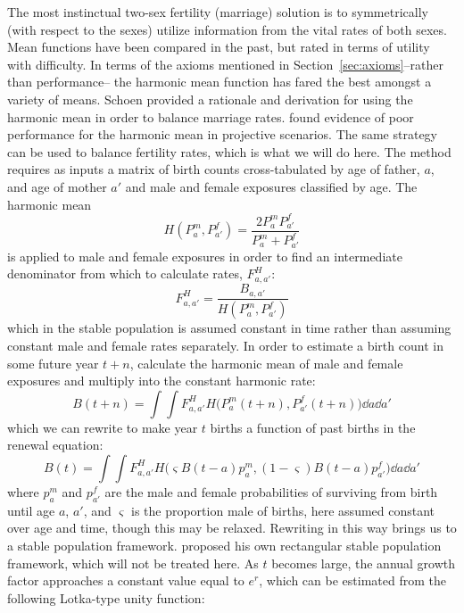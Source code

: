 The most instinctual two-sex fertility (marriage) solution is to symmetrically
(with respect to the sexes) utilize information from the vital rates of both
sexes. Mean functions have been compared in the past\citep[see
e.g.][]{keyfitz1972mathematics}, but rated in terms of utility with difficulty.
In terms of the axioms mentioned in Section~\ref{sec:axioms}--rather than
performance-- the harmonic mean function has fared the best amongst a variety of
means. Schoen \citep{schoen1978standardized, schoen1977two, schoen1981harmonic}
provided a rationale and derivation for using the harmonic mean in order to 
balance marriage rates. \citet{martcheva2001mathematics} found evidence of
poor performance for the harmonic mean in projective scenarios. The same
strategy can be used to balance fertility rates, which is what we will do here. The method requires as inputs a matrix of birth counts cross-tabulated by age of father, $a$, and age of mother $a'$ 
and male and female exposures classified by age. The harmonic mean
\begin{equation}
H(P_a^m, P_{a'}^f) = \frac{2 P_a^m P_{a'}^f}{P_a^m + P_{a'}^f}
\end{equation}
is applied to male and female exposures in order to find an intermediate
denominator from which to calculate rates, $F_{a,a'}^H$:
 \FloatBarrier
 \begin{equation}
 F_{a,a'}^H = \frac{B_{a,a'}}{H(P_a^m, P_{a'}^f)}
 \end{equation}
which in the stable population is assumed constant in time rather than
assuming constant male and female rates separately. In order to estimate 
a birth count in some future year $t+n$, calculate the harmonic mean
of male and female exposures and multiply into the constant harmonic rate:
 \begin{equation}
 B(t+n) = \int \int F_{a,a'}^H H\Big(P_{a}^m(t+n), P_{a'}^f(t+n)\Big) \dd a \dd
 a'
 \end{equation}
which we can rewrite to make year $t$ births a function of past births in the
renewal equation:
 \begin{equation}
 B(t) = \int \int F_{a,a'}^H H\Big(\varsigma B(t-a)p_a^m, (1-\varsigma) B(t-a)
 p_{a'}^f\Big) \dd a
 \dd a'
 \end{equation}
where $p_a^m$ and $p_{a'}^f$ are the male and female probabilities of surviving
from birth until age $a$, $a'$, and $\varsigma$ is the proportion male of
births, here assumed constant over age and time, though this may be relaxed.
Rewriting in this way brings us to a stable population framework. \citet{schoen1977two} 
proposed his own rectangular stable population framework, which 
will not be treated here. As $t$ becomes large, the annual growth factor
approaches a constant value equal to $e^r$, which can be estimated from the
following Lotka-type unity function: 

